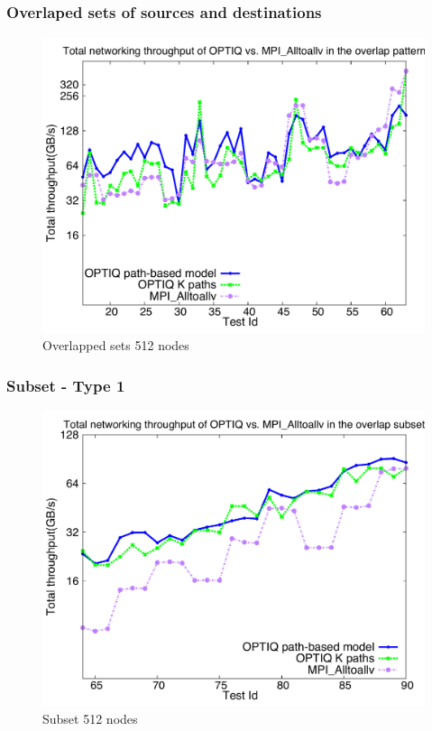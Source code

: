 \subsubsection{Overlaped sets of sources and destinations}

\begin{figure}[!htb]
\vspace{-0.1in}
\centering
\includegraphics[scale=0.30]{figures/overlap_512.pdf}
\vspace{-0.1in}
\caption{Overlapped sets 512 nodes}
\vspace{-0.1in}
\label{fig:overlap_512}
\end{figure}

\subsubsection{Subset - Type 1}

\begin{figure}[!htb]
\vspace{-0.1in}
\centering
\includegraphics[scale=0.30]{figures/subset_512.pdf}
\vspace{-0.1in}
\caption{Subset 512 nodes}
\vspace{-0.1in}
\label{fig:subset_512}
\end{figure}

